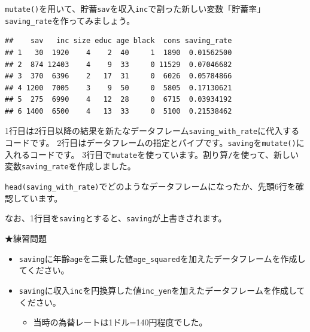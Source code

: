 \documentclass[]{book}
\newenvironment{Shaded}{\begin{snugshade}}{\end{snugshade}}
\newcommand{\KeywordTok}[1]{\textcolor[rgb]{0.13,0.29,0.53}{\textbf{#1}}}
\newcommand{\DataTypeTok}[1]{\textcolor[rgb]{0.13,0.29,0.53}{#1}}
\newcommand{\StringTok}[1]{\textcolor[rgb]{0.31,0.60,0.02}{#1}}
\newcommand{\OperatorTok}[1]{\textcolor[rgb]{0.81,0.36,0.00}{\textbf{#1}}}
\newcommand{\NormalTok}[1]{#1}
\providecommand{\tightlist}{%
  \setlength{\itemsep}{0pt}\setlength{\parskip}{0pt}}
\begin{document}
\texttt{mutate()}を用いて、貯蓄\texttt{sav}を収入\texttt{inc}で割った新しい変数「貯蓄率」\texttt{saving\_rate}を作ってみましょう。

\begin{Shaded}
\end{Shaded}

\begin{verbatim}
##    sav   inc size educ age black  cons saving_rate
## 1   30  1920    4    2  40     1  1890  0.01562500
## 2  874 12403    4    9  33     0 11529  0.07046682
## 3  370  6396    2   17  31     0  6026  0.05784866
## 4 1200  7005    3    9  50     0  5805  0.17130621
## 5  275  6990    4   12  28     0  6715  0.03934192
## 6 1400  6500    4   13  33     0  5100  0.21538462
\end{verbatim}

1行目は2行目以降の結果を新たなデータフレーム\texttt{saving\_with\_rate}に代入するコードです。
2行目はデータフレームの指定とパイプです。\texttt{saving}を\texttt{mutate()}に入れるコードです。
3行目で\texttt{mutate}を使っています。割り算\texttt{/}を使って、新しい変数\texttt{saving\_rate}を作成しました。

\texttt{head(saving\_with\_rate)}でどのようなデータフレームになったか、先頭6行を確認しています。

なお、1行目を\texttt{saving}とすると、\texttt{saving}が上書きされます。

★練習問題

\begin{itemize}
\tightlist
\item
  \texttt{saving}に年齢\texttt{age}を二乗した値\texttt{age\_squared}を加えたデータフレームを作成してください。
\item
  \texttt{saving}に収入\texttt{inc}を円換算した値\texttt{inc\_yen}を加えたデータフレームを作成してください。

  \begin{itemize}
  \tightlist
  \item
    当時の為替レートは1ドル=140円程度でした。
  \end{itemize}
\end{itemize}
\end{document}
